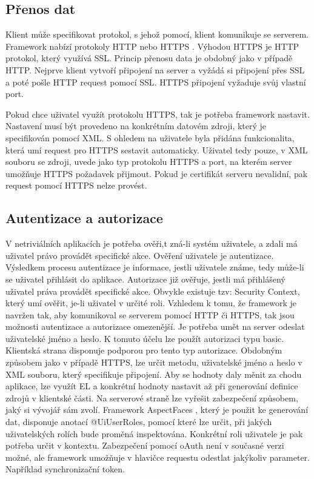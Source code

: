 \subsection{Přenos dat}
Klient může specifikovat protokol, s jehož pomocí, klient komunikuje se serverem. Framework nabízí protokoly HTTP nebo HTTPS \cite{https}. Výhodou HTTPS je HTTP protokol, který využívá SSL. Princip přenosu data je obdobný jako v případě HTTP. Nejprve klient vytvoří připojení na server a vyžádá si připojení přes SSL a poté pošle HTTP request pomocí SSL. HTTPS připojení vyžaduje svůj vlastní port. 

Pokud chce uživatel využít protokolu HTTPS, tak je potřeba framework nastavit. Nastavení musí být provedeno na konkrétním datovém zdroji, který je specifikován pomocí XML. S ohledem na uživatele byla přidána funkcionalita, která umí request pro HTTPS sestavit automaticky. Uživatel tedy pouze, v XML souboru se zdroji, uvede jako typ protokolu HTTPS a port, na kterém server umožňuje HTTPS požadavek přijmout. Pokud je certifikát serveru nevalidní, pak request pomocí HTTPS nelze provést.

\subsection{Autentizace a autorizace}
V netriviálních aplikacích je potřeba ověři,t zná-li systém uživatele, a zdali má uživatel právo provádět specifické akce. Ověření uživatele je autentizace. Výsledkem procesu autentizace je informace, jestli uživatele známe, tedy může-li se uživatel přihlásit do aplikace. Autorizace již ověřuje, jestli má přihlášený uživatel práva provádět specifické akce. Obvykle existuje tzv: Security Context, který umí ověřit, je-li uživatel v určité roli. Vzhledem k tomu, že framework je navržen tak, aby komunikoval se serverem pomocí HTTP či HTTPS, tak jsou možnosti autentizace a autorizace omezenější. Je potřeba umět na server odeslat uživatelské jméno a heslo. K tomuto účelu lze použít autorizaci typu basic. Klientská strana disponuje podporou pro tento typ autorizace. Obdobným způsobem jako v případě HTTPS, lze určit metodu, uživatelské jméno a heslo v XML souboru, který specifikuje připojení. Aby se hodnoty daly měnit za chodu aplikace, lze využít EL a konkrétní hodnoty nastavit až při generování definice zdrojů v klientské části. Na serverové straně lze vyřešit zabezpečení způsobem, jaký si vývojář sám zvolí. Framework AspectFaces \cite{aspectfaces}, který je použit ke generování dat, disponuje anotací @UiUserRoles, pomocí které lze určit, při jakých uživatelských rolích bude proměná inspektována. Konkrétní roli uživatele je pak potřeba určit v kontextu. Zabezpečení pomocí oAuth není v současné verzi možné, ale framework umožňuje v hlavičce requestu odestlat jakýkoliv parameter. Například synchronizační token. 

